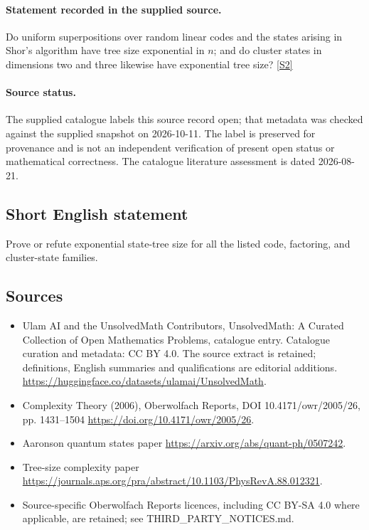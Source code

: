 \documentclass[11pt]{article}
\begin{document}
\paragraph{Statement recorded in the supplied source.}
Do uniform superpositions over random linear codes and the states arising in Shor's algorithm have tree size exponential in $n$; and do cluster states in dimensions two and three likewise have exponential tree size? \href{https://doi.org/10.4171/owr/2005/26}{[S2]}
\paragraph{Source status.}
The supplied catalogue labels this source record open; that metadata was checked against the supplied snapshot on 2026-10-11. The label is preserved for provenance and is not an independent verification of present open status or mathematical correctness. The catalogue literature assessment is dated 2026-08-21.
\subsection{Short English statement}
Prove or refute exponential state-tree size for all the listed code, factoring, and cluster-state families.
\subsection{Sources}
\begin{itemize}
\item[S1] Ulam AI and the UnsolvedMath Contributors, UnsolvedMath: A Curated Collection of Open Mathematics Problems, catalogue entry. Catalogue curation and metadata: CC BY 4.0. The source extract is retained; definitions, English summaries and qualifications are editorial additions.
\url{https://huggingface.co/datasets/ulamai/UnsolvedMath}.
\item[S2] Complexity Theory (2006), Oberwolfach Reports, DOI 10.4171/owr/2005/26, pp. 1431--1504
\url{https://doi.org/10.4171/owr/2005/26}.
\item[S3] Aaronson quantum states paper
\url{https://arxiv.org/abs/quant-ph/0507242}.
\item[S4] Tree-size complexity paper
\url{https://journals.aps.org/pra/abstract/10.1103/PhysRevA.88.012321}.
\item Source-specific Oberwolfach Reports licences, including CC BY-SA 4.0 where applicable, are retained; see THIRD\_PARTY\_NOTICES.md.
\end{itemize}
\end{document}
